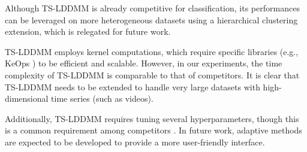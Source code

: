 Although TS-LDDMM 
is already competitive for classification, its performances can be leveraged on 
more heterogeneous datasets using a hierarchical clustering extension, which is relegated for future work. 

 TS-LDDMM employs kernel computations, which require specific libraries (e.g., KeOps \cite{charlier2021kernel}) to be efficient and scalable.
 However, in our experiments, the time complexity of TS-LDDMM is comparable to that of competitors.
 It is clear that TS-LDDMM needs to be extended to handle very large datasets with high-dimensional time series (such as videos).
 
 Additionally, TS-LDDMM requires tuning several hyperparameters, though this is a common requirement among competitors \cite{glaunes2008large, oh2024stable, wu2024shape, heo2024logistic}.
 In future work, adaptive methods are expected to be developed to provide a more user-friendly interface.






